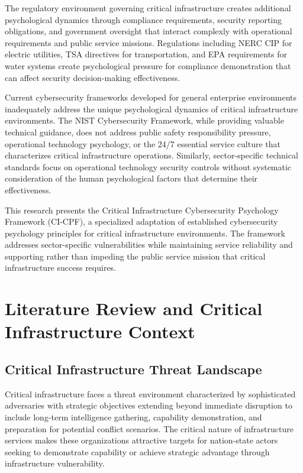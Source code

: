 \documentclass[10pt, twocolumn]{article}
\begin{document}
The regulatory environment governing critical infrastructure creates additional psychological dynamics through compliance requirements, security reporting obligations, and government oversight that interact complexly with operational requirements and public service missions. Regulations including NERC CIP for electric utilities, TSA directives for transportation, and EPA requirements for water systems create psychological pressure for compliance demonstration that can affect security decision-making effectiveness.

Current cybersecurity frameworks developed for general enterprise environments inadequately address the unique psychological dynamics of critical infrastructure environments. The NIST Cybersecurity Framework, while providing valuable technical guidance, does not address public safety responsibility pressure, operational technology psychology, or the 24/7 essential service culture that characterizes critical infrastructure operations. Similarly, sector-specific technical standards focus on operational technology security controls without systematic consideration of the human psychological factors that determine their effectiveness.

This research presents the Critical Infrastructure Cybersecurity Psychology Framework (CI-CPF), a specialized adaptation of established cybersecurity psychology principles for critical infrastructure environments. The framework addresses sector-specific vulnerabilities while maintaining service reliability and supporting rather than impeding the public service mission that critical infrastructure success requires.

\section{Literature Review and Critical Infrastructure Context}

\subsection{Critical Infrastructure Threat Landscape}

Critical infrastructure faces a threat environment characterized by sophisticated adversaries with strategic objectives extending beyond immediate disruption to include long-term intelligence gathering, capability demonstration, and preparation for potential conflict scenarios. The critical nature of infrastructure services makes these organizations attractive targets for nation-state actors seeking to demonstrate capability or achieve strategic advantage through infrastructure vulnerability.
\end{document}
